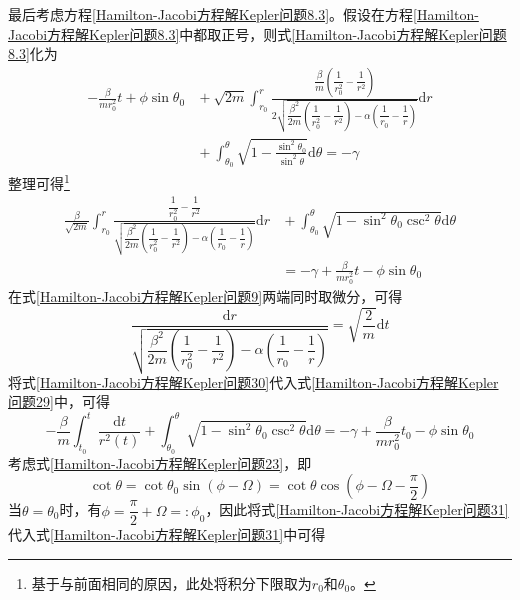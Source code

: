 最后考虑方程\eqref{Hamilton-Jacobi方程解Kepler问题8.3}。假设在方程\eqref{Hamilton-Jacobi方程解Kepler问题8.3}中都取正号，则式\eqref{Hamilton-Jacobi方程解Kepler问题8.3}化为
\begin{align*}
	-\frac{\beta}{mr_0^2}t + \phi\sin\theta_0 & {}+\sqrt{2m}\int_{r_0}^r \frac{\dfrac{\beta}{m}\left(\dfrac{1}{r_0^2}-\dfrac{1}{r^2}\right)}{2\sqrt{\dfrac{\beta^2}{2m}\left(\dfrac{1}{r_0^2}-\dfrac{1}{r^2}\right)-\alpha\left(\dfrac{1}{r_0}-\dfrac{1}{r}\right)}}\mathrm{d}r \\
	& {} + \int_{\theta_0}^\theta \sqrt{1-\frac{\sin^2\theta_0}{\sin^2\theta}}\mathrm{d}\theta = -\gamma
\end{align*}
整理可得\footnote{基于与前面相同的原因，此处将积分下限取为$r_0$和$\theta_0$。}
\begin{align}
	\frac{\beta}{\sqrt{2m}}\int_{r_0}^r \frac{\dfrac{1}{r_0^2}-\dfrac{1}{r^2}}{\sqrt{\dfrac{\beta^2}{2m}\left(\dfrac{1}{r_0^2}-\dfrac{1}{r^2}\right)-\alpha\left(\dfrac{1}{r_0}-\dfrac{1}{r}\right)}} \mathrm{d}r & {}+ \int_{\theta_0}^\theta \sqrt{1-\sin^2\theta_0\csc^2\theta} \mathrm{d}\theta \nonumber \\
	& = -\gamma + \frac{\beta}{mr_0^2}t - \phi\sin\theta_0
	\label{Hamilton-Jacobi方程解Kepler问题29}
\end{align}
在式\eqref{Hamilton-Jacobi方程解Kepler问题9}两端同时取微分，可得
\begin{equation}
	\frac{\mathrm{d}r}{\sqrt{\dfrac{\beta^2}{2m}\left(\dfrac{1}{r_0^2}-\dfrac{1}{r^2}\right)-\alpha\left(\dfrac{1}{r_0}-\dfrac{1}{r}\right)}} = \sqrt{\frac{2}{m}}\mathrm{d}t
	\label{Hamilton-Jacobi方程解Kepler问题30}
\end{equation}
将式\eqref{Hamilton-Jacobi方程解Kepler问题30}代入式\eqref{Hamilton-Jacobi方程解Kepler问题29}中，可得
\begin{equation}
	-\frac{\beta}{m}\int_{t_0}^t \frac{\mathrm{d}t}{r^2(t)} + \int_{\theta_0}^\theta \sqrt{1-\sin^2\theta_0\csc^2\theta} \mathrm{d}\theta = -\gamma + \frac{\beta}{mr_0^2}t_0-\phi\sin\theta_0
	\label{Hamilton-Jacobi方程解Kepler问题31}
\end{equation}
考虑式\eqref{Hamilton-Jacobi方程解Kepler问题23}，即
\begin{equation}
	\cot\theta = \cot\theta_0\sin(\phi-\varOmega) = \cot\theta\cos\left(\phi-\varOmega-\dfrac{\pi}{2}\right)
	\label{Hamilton-Jacobi方程解Kepler问题32}
\end{equation}
当$\theta=\theta_0$时，有$\phi=\dfrac{\pi}{2}+\varOmega=:\phi_0$，因此将式\eqref{Hamilton-Jacobi方程解Kepler问题31}代入式\eqref{Hamilton-Jacobi方程解Kepler问题31}中可得

